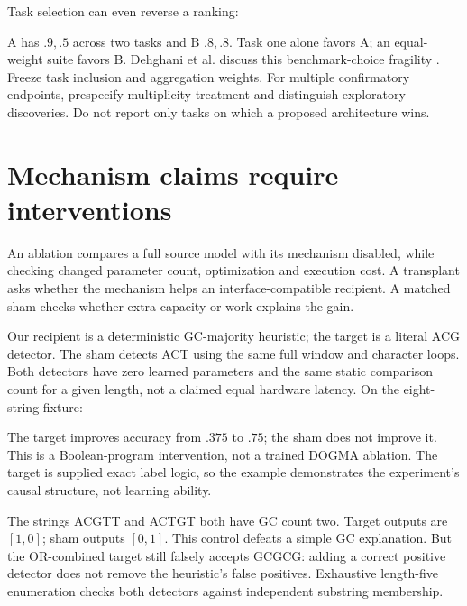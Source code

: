 Task selection can even reverse a ranking:
\begin{center}\end{center}
A has $.9,.5$ across two tasks and B $.8,.8$. Task one alone favors A;
an equal-weight suite favors B. Dehghani et al. discuss this benchmark-choice
fragility \cite{evod29:lottery}. Freeze task inclusion and aggregation weights.
For multiple confirmatory endpoints, prespecify multiplicity treatment and
distinguish exploratory discoveries. Do not report only tasks on which a
proposed architecture wins.

\section{Mechanism claims require interventions}
An ablation compares a full source model with its mechanism disabled, while checking
changed parameter count, optimization and execution cost. A transplant asks whether
the mechanism helps an interface-compatible recipient. A matched sham checks whether
extra capacity or work explains the gain.

Our recipient is a deterministic GC-majority heuristic; the target is a literal
ACG detector. The sham detects ACT using the same full window and character loops.
Both detectors have zero learned parameters and the same static comparison count
for a given length, not a claimed equal hardware latency.
On the eight-string fixture:
\begin{center}\end{center}
The target improves accuracy from $.375$ to $.75$; the sham does not improve it.
This is a Boolean-program intervention, not a trained DOGMA ablation.
The target is supplied exact label logic, so the example demonstrates the
experiment's causal structure, not learning ability.

The strings ACGTT and ACTGT both have GC count two. Target outputs are $[1,0]$;
sham outputs $[0,1]$. This control defeats a simple GC explanation.
But the OR-combined target still falsely accepts GCGCG: adding a correct positive
detector does not remove the heuristic's false positives.
Exhaustive length-five enumeration checks both detectors against independent
substring membership.

